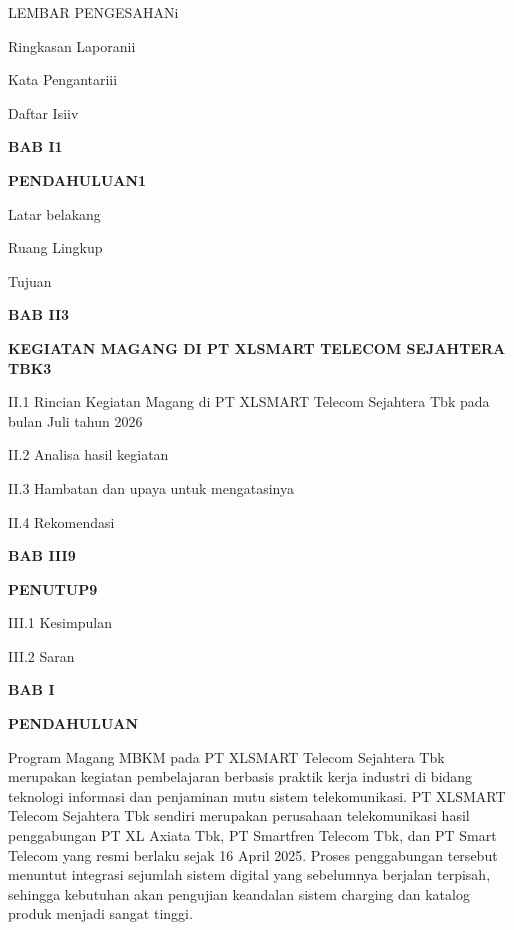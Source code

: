 \documentclass[12pt,a4paper]{article}
\begin{document}
\noindent LEMBAR PENGESAHAN\dotfill i\par
\noindent Ringkasan Laporan\dotfill ii\par
\noindent Kata Pengantar\dotfill iii\par
\noindent Daftar Isi\dotfill iv\par
\noindent\textbf{BAB I}\dotfill \textbf{1}\par
\noindent\textbf{PENDAHULUAN}\dotfill \textbf{1}\par
{} Latar belakang\par
{} Ruang Lingkup\par
{} Tujuan\par
\noindent\textbf{BAB II}\dotfill \textbf{3}\par
\noindent\textbf{KEGIATAN MAGANG DI PT XLSMART TELECOM SEJAHTERA TBK}\dotfill \textbf{3}\par
\noindent II.1 Rincian Kegiatan Magang di PT XLSMART Telecom Sejahtera Tbk pada bulan Juli tahun 2026\par
\noindent II.2 Analisa hasil kegiatan\par
\noindent II.3 Hambatan dan upaya untuk mengatasinya\par
\noindent II.4 Rekomendasi\par
\noindent\textbf{BAB III}\dotfill \textbf{9}\par
\noindent\textbf{PENUTUP}\dotfill \textbf{9}\par
\noindent III.1 Kesimpulan\par
\noindent III.2 Saran\par

\clearpage
{}
\setcounter{page}{1}

\begin{center}
    {\bfseries\large BAB I\par}
    {\bfseries\large PENDAHULUAN\par}
\end{center}
\vspace{0.3cm}

Program Magang MBKM pada PT XLSMART Telecom Sejahtera Tbk merupakan kegiatan pembelajaran berbasis praktik kerja industri di bidang teknologi informasi dan penjaminan mutu sistem telekomunikasi. PT XLSMART Telecom Sejahtera Tbk sendiri merupakan perusahaan telekomunikasi hasil penggabungan PT XL Axiata Tbk, PT Smartfren Telecom Tbk, dan PT Smart Telecom yang resmi berlaku sejak 16 April 2025. Proses penggabungan tersebut menuntut integrasi sejumlah sistem digital yang sebelumnya berjalan terpisah, sehingga kebutuhan akan pengujian keandalan sistem charging dan katalog produk menjadi sangat tinggi.
\end{document}
